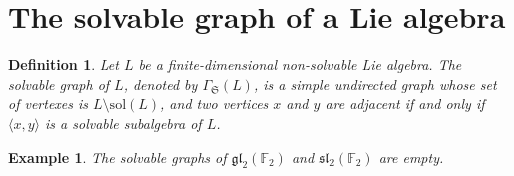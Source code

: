 \documentclass[11pt]{amsart}
\theoremstyle{plain}
\newtheorem{corollary}[theorem]{Corollary}
\newtheorem{definition}{Definition}[section]
\newtheorem{example}[theorem]{Example}
\def\F{\mathbb{F}}
\def\ch{\mathrm{char}}
\def\sol{\mathrm{sol}}
\begin{document}
















\section{The solvable graph of a Lie algebra}

\begin{definition}
Let $L$ be a finite-dimensional non-solvable Lie algebra. The solvable graph of $L$, denoted by $\Gamma_{\mathfrak{S}}(L)$, is a simple undirected graph whose set of vertexes is $L\setminus \sol(L)$, and two vertices $x$ and $y$ are adjacent if and only if $\langle x, y\rangle$ is a solvable subalgebra of $L$.    
\end{definition}


\begin{example}
The solvable graphs of $\mathfrak{gl}_2(\F_2)$ and $\mathfrak{sl}_2(\F_2)$ are empty.
\end{example}
\end{document}
